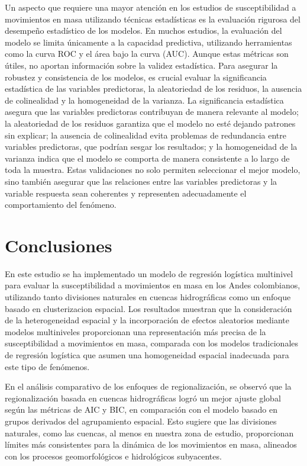 \documentclass[
  manuscript=article,  
  layout=preprint,  
]{format}
\begin{document}
Un aspecto que requiere una mayor atención en los estudios de susceptibilidad a movimientos en masa utilizando técnicas estadísticas es la evaluación rigurosa del desempeño estadístico de los modelos. En muchos estudios, la evaluación del modelo se limita únicamente a la capacidad predictiva, utilizando herramientas como la curva ROC y el área bajo la curva (AUC). Aunque estas métricas son útiles, no aportan información sobre la validez estadística. Para asegurar la robustez y consistencia de los modelos, es crucial evaluar la significancia estadística de las variables predictoras, la aleatoriedad de los residuos, la ausencia de colinealidad y la homogeneidad de la varianza. La significancia estadística asegura que las variables predictoras contribuyan de manera relevante al modelo; la aleatoriedad de los residuos garantiza que el modelo no esté dejando patrones sin explicar; la ausencia de colinealidad evita problemas de redundancia entre variables predictoras, que podrían sesgar los resultados; y la homogeneidad de la varianza indica que el modelo se comporta de manera consistente a lo largo de toda la muestra. Estas validaciones no solo permiten seleccionar el mejor modelo, sino también asegurar que las relaciones entre las variables predictoras y la variable respuesta sean coherentes y representen adecuadamente el comportamiento del fenómeno.

\section{Conclusiones}
En este estudio se ha implementado un modelo de regresión logística multinivel para evaluar la susceptibilidad a movimientos en masa en los Andes colombianos, utilizando tanto divisiones naturales en cuencas hidrográficas como un enfoque basado en clusterizacion espacial. Los resultados muestran que la consideración de la heterogeneidad espacial y la incorporación de efectos aleatorios mediante modelos multiniveles proporcionan una representación más precisa de la susceptibilidad a movimientos en masa, comparada con los modelos tradicionales de regresión logística que asumen una homogeneidad espacial inadecuada para este tipo de fenómenos.

En el análisis comparativo de los enfoques de regionalización, se observó que la regionalización basada en cuencas hidrográficas logró un mejor ajuste global según las métricas de AIC y BIC, en comparación con el modelo basado en grupos derivados del agrupamiento espacial. Esto sugiere que las divisiones naturales, como las cuencas, al menos en nuestra zona de estudio, proporcionan límites más consistentes para la dinámica de los movimientos en masa, alineados con los procesos geomorfológicos e hidrológicos subyacentes.
\end{document}
